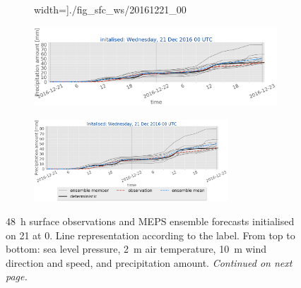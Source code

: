 \begin{figure}[H]
\begin{subfigure}[b]{0.9\textwidth}
		width=\textwidth]{./fig_sfc_ws/20161221_00}
		\caption{}\label{fig:res:sfc_ws21}
	\end{subfigure}
	\begin{subfigure}[b]{0.9\textwidth}
		\includegraphics[trim={0.cm 1.5cm 0cm 0cm},clip,
		width=\textwidth]{./fig_sfc_precip/20161221_00}
		\caption{}\label{fig:res:sfc_precip21}
	\end{subfigure}
	\begin{subfigure}[b]{\textwidth}
		\centering
		\includegraphics[trim={5.5cm 0cm 5.cm 17.7cm},clip,
		width=0.8\textwidth]{./fig_sfc_precip/20161221_00_label}
	\end{subfigure}
	\caption{\SI{48}{\hour} surface observations and MEPS ensemble forecasts initialised on \SI{21}{\dec} at \SI{0}{\UTC}. 
		Line representation according to the label. From top to bottom: sea level pressure, \SI{2}{\metre} air temperature, \SI{10}{\metre} wind direction and speed, and precipitation amount. \textit{Continued on next page.}}\label{fig:obs_meps:21}
\end{figure}
